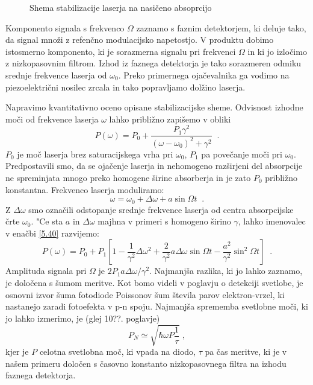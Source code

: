 \begin{figure}[tbp]
\label{s5.13} \vskip 7cm
\caption{Shema stabilizacije laserja na nasičeno absoprcijo}
\end{figure}

Komponento signala s frekvenco $\Omega$ zaznamo s faznim detektorjem, ki
deluje tako, da signal množi z refenčno modulacijsko napetostjo. V
produktu dobimo istosmerno komponento, ki je sorazmerna signalu pri
frekvenci $\Omega$ in ki jo izločimo z nizkopasovnim filtrom. Izhod iz
faznega detektorja je tako sorazmeren odmiku srednje frekvence laserja od $%
\omega_0$. Preko primernega ojačevalnika ga vodimo na piezoelektrični
nosilec zrcala in tako popravljamo dolžino laserja.

Napravimo kvantitativno oceno opisane stabilizacijske sheme. Odvisnost
izhodne moči od frekvence laserja $\omega$ lahko približno zapišemo v
obliki 
\begin{equation}  \label{5.40}
P(\omega)=P_0 + \frac{P_1\gamma^2}{(\omega- \omega_0)^2+\gamma^2}\;\;.
\end{equation}
$P_0$ je moč laserja brez saturacijskega vrha pri $\omega_0$, $P_1$ pa
povečanje moči pri $\omega_0$. Predpostavili smo, da se ojačenje laserja
in nehomogeno razširjeni del absorpcije ne spreminjata mnogo preko homogene
širine absorberja in je zato $P_0$ približno konstantna. Frekvenco laserja
moduliramo: 
\begin{equation}  \label{5.41}
\omega=\omega_0+\Delta\omega+a \sin \Omega t\;\;.
\end{equation}
Z $\Delta\omega$ smo označili odstopanje srednje frekvence laserja od
centra absorpcijske črte $\omega_0$. "Ce sta $a$ in $\Delta\omega$ majhna v
primeri s homogeno širino $\gamma$, lahko imenovalec v enačbi \ref{5.40}
razvijemo: 
\begin{equation}  \label{5.42}
P(\omega)=P_0+P_1 [1-\frac{1}{\gamma^2}\Delta\omega^2 +\frac{2}{\gamma^2} a
\Delta\omega \sin\Omega t - \frac{a^2}{\gamma^2}\sin^2\Omega t ]\;\;.
\end{equation}
Amplituda signala pri $\Omega$ je $2P_1 a \Delta\omega/\gamma^2$. Najmanjša
razlika, ki jo lahko zaznamo, je določena s šumom meritve. Kot bomo videli
v poglavju o detekciji svetlobe, je osnovni izvor šuma fotodiode Poissonov
šum števila parov elektron-vrzel, ki nastanejo zaradi fotoefekta v p-n
spoju. Najmanjša sprememba svetlobne moči, ki jo lahko izmerimo, je (glej
10??. poglavje) 
\begin{equation}  \label{5.43}
P_N\simeq \sqrt{\hbar\omega P \frac{1}{\tau}}\;,
\end{equation}
kjer je $P$ celotna svetlobna moč, ki vpada na diodo, $\tau$ pa čas
meritve, ki je v našem primeru določen s časovno konstanto nizkopasovnega
filtra na izhodu faznega detektorja.

